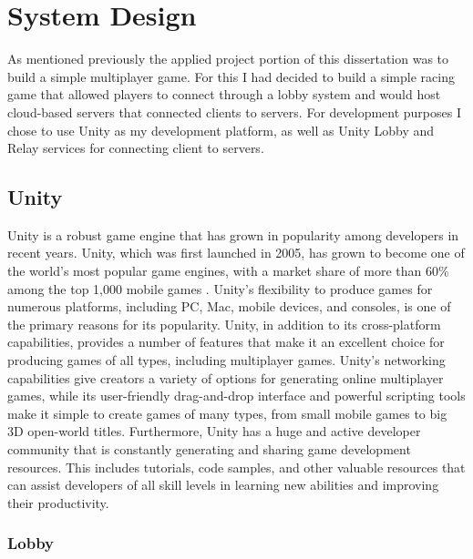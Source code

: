 \chapter{System Design}

As mentioned previously the applied project portion of this dissertation was to build a simple multiplayer game. For this I had decided to build a simple racing game that allowed players to connect through a lobby system and would host cloud-based servers that connected clients to servers.
For development purposes I chose to use Unity as my development platform, as well as Unity Lobby and Relay services for connecting client to servers.

\section{Unity}

Unity is a robust game engine that has grown in popularity among developers in recent years. Unity, which was first launched in 2005, has grown to become one of the world's most popular game engines, with a market share of more than 60\% among the top 1,000 mobile games \cite{stepico-unity}. Unity's flexibility to produce games for numerous platforms, including PC, Mac, mobile devices, and consoles, is one of the primary reasons for its popularity.
Unity, in addition to its cross-platform capabilities, provides a number of features that make it an excellent choice for producing games of all types, including multiplayer games. Unity's networking capabilities give creators a variety of options for generating online multiplayer games, while its user-friendly drag-and-drop interface and powerful scripting tools make it simple to create games of many types, from small mobile games to big 3D open-world titles.
Furthermore, Unity has a huge and active developer community that is constantly generating and sharing game development resources. This includes tutorials, code samples, and other valuable resources that can assist developers of all skill levels in learning new abilities and improving their productivity.

\subsection{Lobby}

